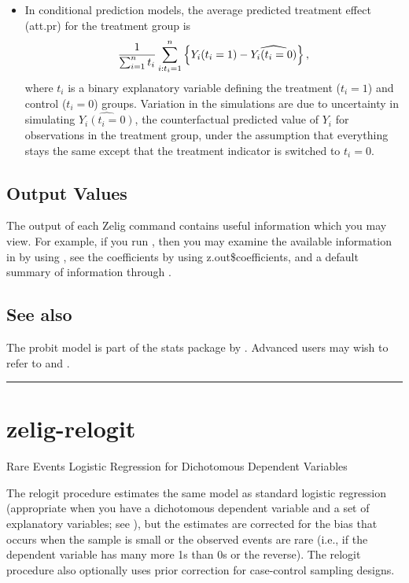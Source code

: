\documentclass[letterpaper,10pt,english]{sphinxmanual}
\begin{document}
\begin{itemize}
\item {} 
In conditional prediction models, the average predicted treatment
effect (att.pr) for the treatment group is
\begin{gather}
\begin{split}\frac{1}{\sum_{i=1}^n t_i}\sum_{i:t_i=1}^n \left\{ Y_i(t_i=1) -
      \widehat{Y_i(t_i=0)} \right\},\end{split}\notag
\end{gather}
where \(t_i\) is a binary explanatory variable defining the
treatment (\(t_i=1\)) and control (\(t_i=0\)) groups.
Variation in the simulations are due to uncertainty in simulating
\(\widehat{Y_i(t_i=0)}\), the counterfactual predicted value of
\(Y_i\) for observations in the treatment group, under the
assumption that everything stays the same except that the treatment
indicator is switched to \(t_i=0\).

\end{itemize}


\subsection{Output Values}
\label{vignette:id50}
The output of each Zelig command contains useful information which you
may view. For example, if you run
, then you may examine
the available information in  by using , see
the coefficients by using z.out\$coefficients, and a default summary of
information through .


\subsection{See also}
\label{vignette:id51}
The probit model is part of the stats package by . Advanced users may
wish to refer to  and .


\bigskip\hrule{}\bigskip



\section{zelig-relogit}
\label{vignette:zelig-relogit}
Rare Events Logistic Regression for Dichotomous Dependent Variables

The relogit procedure estimates the same model as standard logistic
regression (appropriate when you have a dichotomous dependent variable
and a set of explanatory variables; see ), but the estimates are
corrected for the bias that occurs when the sample is small or the
observed events are rare (i.e., if the dependent variable has many more
1s than 0s or the reverse). The relogit procedure also optionally uses
prior correction for case-control sampling designs.
\end{document}
